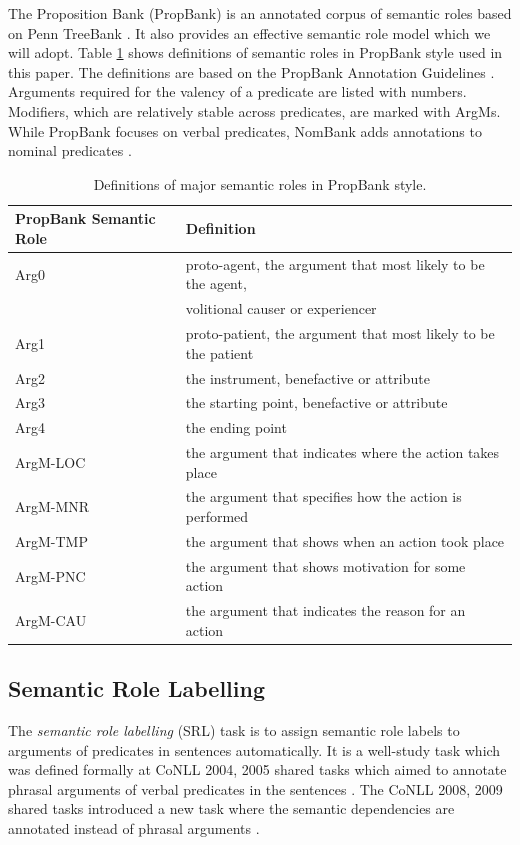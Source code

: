 \documentclass[a4paper]{article}
\begin{document}
The Proposition Bank (PropBank) is an annotated corpus of semantic roles based on Penn TreeBank \citep{palmer2005proposition}. It also provides an effective semantic role model which we will adopt. Table \ref{tab:propbank} shows definitions of semantic roles in PropBank style used in this paper. The definitions are based on the PropBank Annotation Guidelines \citep{bonial2010propbank}. Arguments required for the valency of a predicate are listed with numbers. Modifiers, which are relatively stable across predicates, are marked with ArgMs. While PropBank focuses on verbal predicates, NomBank adds annotations to nominal predicates \citep{meyers2004nombank}. 


\begin{table}[t]
\centering
\begin{tabular}{l|l} 
\hline
\textbf{PropBank Semantic Role}  &   \textbf{Definition} \\ \hline
Arg0                    &   proto-agent, the argument that most likely to be the agent, \\ 
                        &   volitional causer or experiencer \\ \hline
Arg1                    &   proto-patient, the argument that most likely to be the patient \\ \hline
Arg2                    &   the instrument, benefactive or attribute \\ \hline
Arg3                    &   the starting point, benefactive or attribute \\ \hline
Arg4                    &   the ending point \\ \hline
ArgM-LOC                &   the argument that indicates where the action takes place \\ \hline
ArgM-MNR                &   the argument that specifies how the action is performed \\ \hline
ArgM-TMP                &   the argument that shows when an action took place \\ \hline
ArgM-PNC                &   the argument that shows motivation for some action \\ \hline
ArgM-CAU                &   the argument that indicates the reason for an action \\ \hline
\end{tabular}
\caption{\label{tab:propbank} Definitions of major semantic roles in PropBank style.}
\end{table}


\subsection{Semantic Role Labelling} \label{sec:srl}
The \textit{semantic role labelling} (SRL) task is to assign semantic role labels to arguments of predicates in sentences automatically. It is a well-study task which was defined formally at CoNLL 2004, 2005 shared tasks which aimed to annotate phrasal arguments of verbal predicates in the sentences \citep{carreras-marquez:2004:CONLL, carreras-marquez:2005:CoNLL}. The CoNLL 2008, 2009 shared tasks introduced a new task where the semantic dependencies are annotated instead of phrasal arguments \citep{surdeanu-EtAl:2008:CONLL, hajivc-EtAl:2009:CoNLL-2009-ST}. 
\end{document}
